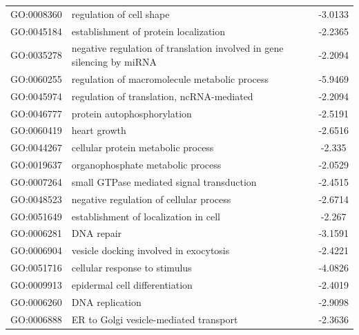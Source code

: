 \documentclass[11pt,twoside,a4paper]{report}
\begin{document}
\begin{appendices}
\begin{longtable}{@{\extracolsep{\fill}}llc@{}}
    GO:0008360 & regulation of cell shape                                               & -3.0133       \\
    GO:0045184 & establishment of protein localization                                  & -2.2365       \\
    GO:0035278 & negative regulation of translation involved in gene silencing by miRNA & -2.2094       \\
    GO:0060255 & regulation of macromolecule metabolic process                          & -5.9469       \\
    GO:0045974 & regulation of translation, ncRNA-mediated                              & -2.2094       \\
    GO:0046777 & protein autophosphorylation                                            & -2.5191       \\
    GO:0060419 & heart growth                                                           & -2.6516       \\
    GO:0044267 & cellular protein metabolic process                                     & -2.335        \\
    GO:0019637 & organophosphate metabolic process                                      & -2.0529       \\
    GO:0007264 & small GTPase mediated signal transduction                              & -2.4515       \\
    GO:0048523 & negative regulation of cellular process                                & -2.6714       \\
    GO:0051649 & establishment of localization in cell                                  & -2.267        \\
    GO:0006281 & DNA repair                                                             & -3.1591       \\
    GO:0006904 & vesicle docking involved in exocytosis                                 & -2.4221       \\
    GO:0051716 & cellular response to stimulus                                          & -4.0826       \\
    GO:0009913 & epidermal cell differentiation                                         & -2.4019       \\
    GO:0006260 & DNA replication                                                        & -2.9098       \\
    GO:0006888 & ER to Golgi vesicle-mediated transport                                 & -2.3636       \\

\end{longtable}
\end{appendices}
\end{document}
